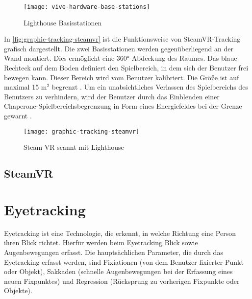 \begin{figure}[!htbp]
	\centering
	\texttt{[image: vive-hardware-base-stations]}
	\caption[Lighthouse Basisstationen]{Lighthouse Basisstationen \cite{ViveBaseStation}}
	\label{fig:vive-hardware-base-stations}
\end{figure}

In \autoref{fig:graphic-tracking-steamvr} ist die Funktionsweise von SteamVR-Tracking grafisch dargestellt. Die zwei Basisstationen werden gegenüberliegend an der Wand montiert. Dies ermöglicht eine 360°-Abdeckung des Raumes. Das blaue Rechteck auf dem Boden definiert den Spielbereich, in dem sich der Benutzer frei bewegen kann. Dieser Bereich wird vom Benutzer kalibriert. Die Größe ist auf maximal 15 m$^2$ begrenzt \cite{ViveProduct}. Um ein unabsichtliches Verlassen des Spielbereichs des Benutzers zu verhindern, wird der Benutzer durch das Einblenden einer Chaperone-Spielbereichsbegrenzung in Form eines Energiefeldes bei der Grenze gewarnt \cite{ViveProduct}. 

\begin{figure}[!htbp]
	\centering
	\texttt{[image: graphic-tracking-steamvr]}
	\caption[Steam VR scannt mit Lighthouse]{Steam VR scannt mit Lighthouse \cite{Sauter.2015}}
	\label{fig:graphic-tracking-steamvr}
\end{figure}

\subsection{SteamVR}

\section{Eyetracking}
Eyetracking ist eine Technologie, die erkennt, in welche Richtung eine Person ihren Blick richtet. Hierfür werden beim Eyetracking Blick sowie Augenbewegungen erfasst. Die hauptsächlichen Parameter, die durch das Eyetracking erfasst werden, sind Fixiationen (von dem Benutzer fixierter Punkt oder Objekt), Sakkaden (schnelle Augenbewegungen bei der Erfassung eines neuen Fixpunktes) und Regression (Rücksprung zu vorherigen Fixpunkte oder Objekte).

